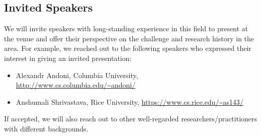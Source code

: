 



\subsection{Invited Speakers}
We will invite speakers with long-standing experience in this field to
present at the venue and offer their perspective on the challenge and
research history in the area.  For example, we reached out to the
following speakers who expressed their interest in giving an invited
presentation:
\begin{itemize}
\item Alexandr Andoni, Columbia University, \url{http://www.cs.columbia.edu/~andoni/}
\item Anshumali Shrivastava, Rice University, \url{https://www.cs.rice.edu/~as143/}
\end{itemize}

If accepted, we will also reach out to other well-regarded
researchers/practitioners with different backgrounds.


